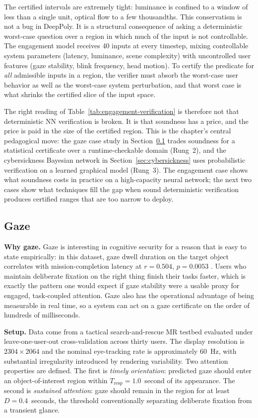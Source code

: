 \documentclass[graybox]{svmult}
\begin{document}
The certified intervals are extremely tight: luminance is confined to a window of less than a single unit, optical flow to a few thousandths. This conservatism is not a bug in DeepPoly. It is a structural consequence of asking a deterministic worst-case question over a region in which much of the input is not controllable. The engagement model receives 40 inputs at every timestep, mixing controllable system parameters (latency, luminance, scene complexity) with uncontrolled user features (gaze stability, blink frequency, head motion). To certify the predicate for \emph{all} admissible inputs in a region, the verifier must absorb the worst-case user behavior as well as the worst-case system perturbation, and that worst case is what shrinks the certified slice of the input space.

The right reading of Table~\ref{tab:engagement-verification} is therefore not that deterministic NN verification is broken. It is that soundness has a price, and the price is paid in the size of the certified region. This is the chapter's central pedagogical move: the gaze case study in Section~\ref{sec:gaze} trades soundness for a statistical certificate over a runtime-checkable domain (Rung~2), and the cybersickness Bayesian network in Section~\ref{sec:cybersickness} uses probabilistic verification on a learned graphical model (Rung~3). The engagement case shows what soundness costs in practice on a high-capacity neural network; the next two cases show what techniques fill the gap when sound deterministic verification produces certified ranges that are too narrow to deploy.

\subsection{Gaze}
\label{sec:gaze}

\textbf{Why gaze.} Gaze is interesting in cognitive security for a reason that is easy to state empirically: in this dataset, gaze dwell duration on the target object correlates with mission-completion latency at $r=0.504$, $p=0.0053$ \citep{gaze2025reliability}. Users who maintain deliberate fixation on the right thing finish their tasks faster, which is exactly the pattern one would expect if gaze stability were a usable proxy for engaged, task-coupled attention. Gaze also has the operational advantage of being measurable in real time, so a system can act on a gaze certificate on the order of hundreds of milliseconds.

\textbf{Setup.} Data come from a tactical search-and-rescue MR testbed evaluated under leave-one-user-out cross-validation across thirty users. The display resolution is $2304 \times 2064$ and the nominal eye-tracking rate is approximately 60~Hz, with substantial irregularity introduced by rendering variability. Two attention properties are defined. The first is \emph{timely orientation}: predicted gaze should enter an object-of-interest region within $T_{\text{resp}}=1.0$~second of its appearance. The second is \emph{sustained attention}: gaze should remain in the region for at least $D=0.4$~seconds, the threshold conventionally separating deliberate fixation from a transient glance.
\end{document}
